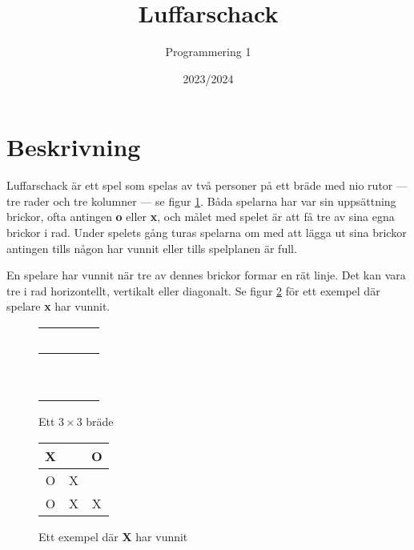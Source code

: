 \documentclass[11pt, a4paper]{article} %
\title{Luffarschack}
\author{Programmering 1}
\date{2023/2024} %
\begin{document}


\maketitle

\section{Beskrivning}

Luffarschack är ett spel som spelas av två personer på ett bräde med nio rutor --- tre rader och tre kolumner --- se figur \ref{b1}. Båda spelarna har var sin uppsättning brickor, ofta antingen \textbf{o} eller \textbf{x}, och målet med spelet är att få tre av sina egna brickor i rad. Under spelets gång turas spelarna om med att lägga ut sina brickor antingen tills någon har vunnit eller tills spelplanen är full.

En spelare har vunnit när tre av dennes brickor formar en rät linje. Det kan vara tre i rad horizontellt, vertikalt eller diagonalt. Se figur \ref{b2} för ett exempel där spelare \textbf{x} har vunnit.

\begin{figure}[ht!]
	\centering
	\begin{tabular}{|c|c|c|}
		\hline
		 ~ &  ~ & ~\\ \hline
		 ~ &  ~ & ~\\ \hline
		 ~ &  ~ & ~\\ \hline
	\end{tabular}
	\caption{Ett $3\times 3$ bräde}
	\label{b1}
\end{figure}

\begin{figure}
	\centering
	\begin{tabular}{|c|c|c|}
		\hline
		 X &  ~ & O\\ \hline
		 O &  X & ~\\ \hline
		 O &  X & X\\ \hline
	\end{tabular}
	\caption{Ett exempel där \textbf{X} har vunnit}
	\label{b2}
\end{figure}
\end{document}
